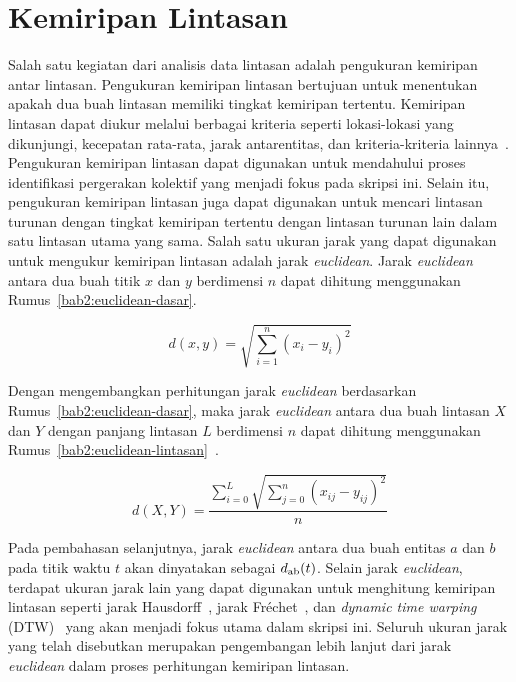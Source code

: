 \section{Kemiripan Lintasan}
\label{sec:kemiripan}

Salah satu kegiatan dari analisis data lintasan adalah pengukuran kemiripan antar lintasan. Pengukuran kemiripan lintasan bertujuan untuk menentukan apakah dua buah lintasan memiliki tingkat kemiripan tertentu. Kemiripan lintasan dapat diukur melalui berbagai kriteria seperti lokasi-lokasi yang dikunjungi, kecepatan rata-rata, jarak antarentitas, dan kriteria-kriteria lainnya~\cite{wiratma:trajectory}. Pengukuran kemiripan lintasan dapat digunakan untuk mendahului proses identifikasi pergerakan kolektif yang menjadi fokus pada skripsi ini. Selain itu, pengukuran kemiripan lintasan juga dapat digunakan untuk mencari lintasan turunan dengan tingkat kemiripan tertentu dengan lintasan turunan lain dalam satu lintasan utama yang sama. Salah satu ukuran jarak yang dapat digunakan untuk mengukur kemiripan lintasan adalah jarak \textit{euclidean}. Jarak \textit{euclidean} antara dua buah titik $x$ dan $y$ berdimensi $n$ dapat dihitung menggunakan Rumus~\ref{bab2:euclidean-dasar}.

\begin{equation}
    d(x, y) = \sqrt{\sum_{i = 1}^{n}(x_i - y_i)^2}
    \label{bab2:euclidean-dasar}
\end{equation}

Dengan mengembangkan perhitungan jarak \textit{euclidean} berdasarkan Rumus~\ref{bab2:euclidean-dasar}, maka jarak \textit{euclidean} antara dua buah lintasan $X$ dan $Y$ dengan panjang lintasan $L$ berdimensi $n$ dapat dihitung menggunakan Rumus~\ref{bab2:euclidean-lintasan}~\cite{su:02:euclidean}.

\begin{equation}
    d(X, Y) = \frac{\sum_{i=0}^{L} \sqrt{\sum_{j=0}^{n}(x_{ij} - y_{ij})^2}}{n}
    \label{bab2:euclidean-lintasan}
\end{equation}

Pada pembahasan selanjutnya, jarak \textit{euclidean} antara dua buah entitas $a$ dan $b$ pada titik waktu $t$ akan dinyatakan sebagai $d\textsubscript{ab}(t)$. Selain jarak \textit{euclidean}, terdapat ukuran jarak lain yang dapat digunakan untuk menghitung kemiripan lintasan seperti jarak Hausdorff~\cite{rote:01:hausdorff}, jarak Fr\'{e}chet~\cite{alt:01:frechet}, dan \textit{dynamic time warping} (DTW)~\cite{muller:dtw} yang akan menjadi fokus utama dalam skripsi ini. Seluruh ukuran jarak yang telah disebutkan merupakan pengembangan lebih lanjut dari jarak \textit{euclidean} dalam proses perhitungan kemiripan lintasan.

